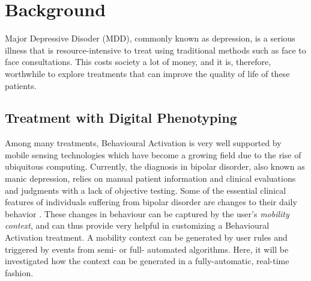 \section{Background}


Major Depressive Disoder (MDD), commonly known as depression, is a serious illness that is resource-intensive to treat using traditional methods such as face to face consultations. This costs society a lot of money, and it is, therefore, worthwhile to explore treatments that can improve the quality of life of these patients. 

\subsection*{Treatment with Digital Phenotyping}
Among many treatments, Behavioural Activation is very well supported by mobile sensing technologies which have become a growing field due to the rise of ubiquitous computing. Currently, the diagnosis in bipolar disorder, also known as manic depression, relies on manual patient information and clinical evaluations and judgments with a lack of objective testing. Some of the essential clinical features of individuals suffering from bipolar disorder are changes to their daily behavior \cite{objective_smartphone_data_as_diagnostic_marker}. These changes in behaviour can be captured by the user's \textit{mobility context}, and can thus provide very helpful in customizing a Behavioural Activation treatment. A mobility context can be generated by user rules and triggered by events from semi- or full- automated algorithms. Here, it will be investigated how the context can be generated in a fully-automatic, real-time fashion.

